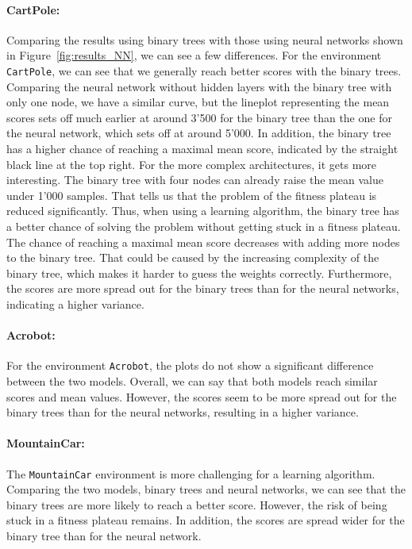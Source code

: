 \paragraph*{CartPole:} Comparing the results using binary trees with those using neural networks shown in Figure~\ref{fig:results_NN}, we can see a few differences. For the environment \verb|CartPole|, we can see that we generally reach  better scores with the binary trees. Comparing the neural network without hidden layers with the binary tree with only one node, we have a similar curve, but the lineplot representing the mean scores sets off much earlier at around 3'500 for the binary tree than the one for the neural network, which sets off at around 5'000. In addition, the binary tree has a higher chance of reaching a maximal mean score, indicated by the straight black line at the top right. For the more complex architectures, it gets more interesting. The binary tree with four nodes can already raise the mean value under 1'000 samples. That tells us that the problem of the fitness plateau is reduced significantly. Thus, when using a learning algorithm, the binary tree has a better chance of solving the problem without getting stuck in a fitness plateau. The chance of reaching a maximal mean score decreases with adding more nodes to the binary tree. That could be caused by the increasing complexity of the binary tree, which makes it harder to guess the weights correctly. Furthermore, the scores are more spread out for the binary trees than for the neural networks, indicating a higher variance.

\paragraph*{Acrobot:} For the environment \verb|Acrobot|, the plots do not show a significant difference between the two models. Overall, we can say that both models reach similar scores and mean values. However, the scores seem to be more spread out for the binary trees than for the neural networks, resulting in a higher variance.

\paragraph*{MountainCar:} The \verb|MountainCar| environment is more challenging for a learning algorithm. Comparing the two models, binary trees and neural networks, we can see that the binary trees are more likely to reach a better score. However, the risk of being stuck in a fitness plateau remains. In addition, the scores are spread wider for the binary tree than for the neural network.

